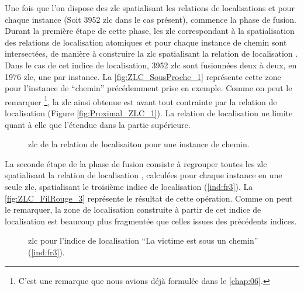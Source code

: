 Une fois que l'on dispose des \ac{zlc} spatialisant les relations de
localisations  et
 pour chaque instance (Soit
\num{3952} \ac{zlc} dans le cas présent), commence la phase de
fusion. Durant la première étape de cette phase, les \ac{zlc}
correspondant à la spatialisation des relations de localisation
atomiques  et
 pour chaque instance de chemin sont
intersectées, de manière à construire la \ac{zlc} spatialisant la
relation de localisation . Dans le cas de
cet indice de localisation, \num{3952} \ac{zlc} sont fusionnées deux à
deux, en \num{1976} \ac{zlc}, une par instance. La
\autoref{fig:ZLC_SousProche_1} représente cette zone pour l'instance
de \enquote{chemin} précédemment prise en exemple. Comme on peut le
remarquer \footnote{C'est une remarque que nous avions déjà formulée
  dans le \autoref{chap:06}.}, la \ac{zlc} ainsi obtenue est avant
tout contrainte par la relation de localisation 
(Figure \ref{fig:Proximal_ZLC_1}). La relation de localisation
 ne limite quant à elle que l'étendue dans
la partie supérieure.

\begin{figure}
  \centering
  
  \caption{\ac{zlc} de la relation de localisaiton
    \protect{} pour une instance de chemin.}
    \label{fig:ZLC_SousProche_1}
\end{figure}

La seconde étape de la phase de fusion consiste à regrouper toutes les
\ac{zlc} spatialisant la relation de localisation
, calculées pour chaque instance en une
seule \ac{zlc}, spatialisant le troisième indice de localisation
(\ref{ind:fr3}). La \autoref{fig:ZLC_FilRouge_3} représente le
résultat de cette opération. Comme on peut le remarquer, la zone de
localisation construite à partir de cet indice de localisation est
beaucoup plus fragmentée que celles issues des précédents
indices. 
 
\begin{figure}
  \centering
  
  \caption{\ac{zlc} pour l'indice de localisation \enquote{La victime
      est sous un chemin} (\ref{ind:fr3}).}
    \label{fig:ZLC_FilRouge_3}
\end{figure}

